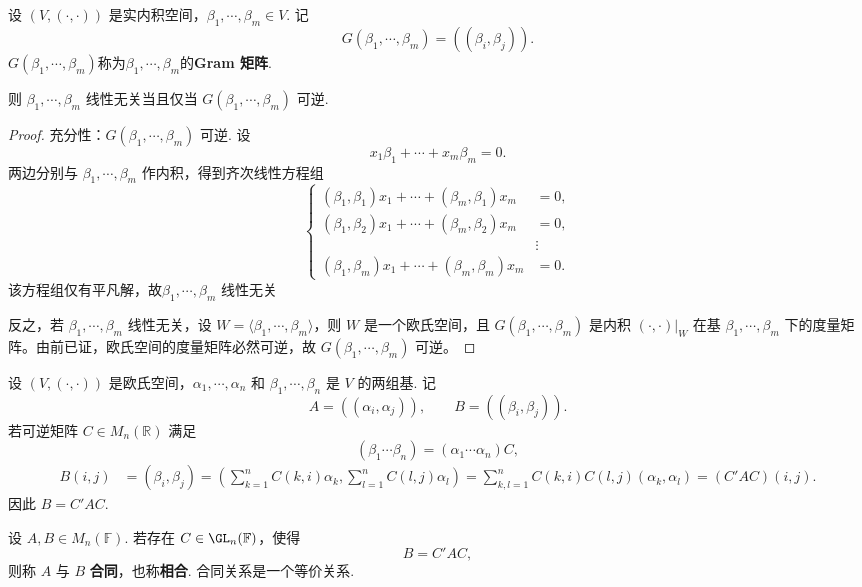 \begin{proposition}
	设 $(V,(\cdot,\cdot))$ 是实内积空间，$\beta_1,\cdots,\beta_m\in V$. 记
	\[
	G(\beta_1,\cdots,\beta_m)=((\beta_i,\beta_j)).
	\]
	$G(\beta_1,\cdots,\beta_m)$称为$\beta_1,\cdots,\beta_m$的\textbf{Gram 矩阵}.
	
	则 $\beta_1,\cdots,\beta_m$ 线性无关当且仅当 $G(\beta_1,\cdots,\beta_m)$ 可逆.
\end{proposition}
\begin{proof}
	充分性：$G(\beta_1,\cdots,\beta_m)$ 可逆. 设
	\[
	x_1\beta_1+\cdots+x_m\beta_m=0.
	\]
	两边分别与 $\beta_1,\cdots,\beta_m$ 作内积，得到齐次线性方程组
	\[
	\left\{
	\begin{aligned}
		(\beta_1,\beta_1)x_1+\cdots+(\beta_m,\beta_1)x_m&=0,\\
		(\beta_1,\beta_2)x_1+\cdots+(\beta_m,\beta_2)x_m&=0,\\
		&\vdots\\
		(\beta_1,\beta_m)x_1+\cdots+(\beta_m,\beta_m)x_m&=0.
	\end{aligned}
	\right.
	\]
	该方程组仅有平凡解，故$\beta_1,\cdots,\beta_m$ 线性无关
	
	反之，若 $\beta_1,\cdots,\beta_m$ 线性无关，设 $W=\langle\beta_1,\cdots,\beta_m\rangle$，则 $W$ 是一个欧氏空间，且 $G(\beta_1,\cdots,\beta_m)$ 是内积 $(\cdot,\cdot)|_W$ 在基 $\beta_1,\cdots,\beta_m$ 下的度量矩阵。由前已证，欧氏空间的度量矩阵必然可逆，故 $G(\beta_1,\cdots,\beta_m)$ 可逆。
\end{proof}

\begin{example}
	设 $(V,(\cdot,\cdot))$ 是欧氏空间，$\alpha_1,\cdots,\alpha_n$ 和 $\beta_1,\cdots,\beta_n$ 是 $V$ 的两组基. 记
	\[
	A=((\alpha_i,\alpha_j)),
	\qquad
	B=((\beta_i,\beta_j)).
	\]
	若可逆矩阵 $C\in M_n(\mathbb{R})$ 满足
	\[
	(\beta_1\cdots\beta_n)=(\alpha_1\cdots\alpha_n)C,
	\]
	\[
	\begin{aligned}
		B(i,j)&=(\beta_i,\beta_j) =\left(\sum_{k=1}^n C(k,i)\alpha_k,\sum_{l=1}^n C(l,j)\alpha_l\right)=\sum_{k,l=1}^n C(k,i)C(l,j)(\alpha_k,\alpha_l)=(C'AC)(i,j).
	\end{aligned}
	\]
	因此 $B=C'AC$.
\end{example}


\begin{definition}
	设 $A,B\in M_n(\mathbb{F})$. 若存在 $C\in \GL_n(\mathbb{F})$，使得
	\[
	B=C'AC,
	\]
	则称 $A$ 与 $B$ \textbf{合同}，也称\textbf{相合}. 合同关系是一个等价关系.
\end{definition}

